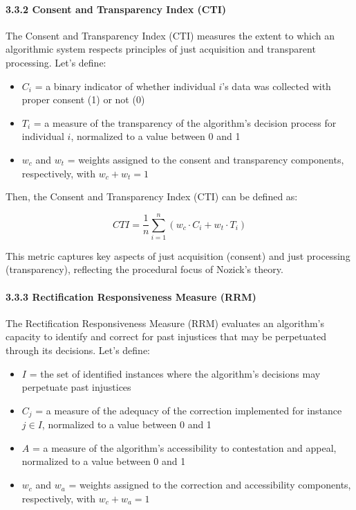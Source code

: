 \paragraph{3.3.2 Consent and Transparency Index
(CTI)}\label{consent-and-transparency-index-cti}

The Consent and Transparency Index (CTI) measures the extent to which an
algorithmic system respects principles of just acquisition and
transparent processing. Let's define:

\begin{itemize}
\tightlist
\item
  \(C_i\) = a binary indicator of whether individual \(i\)'s data was
  collected with proper consent (1) or not (0)
\item
  \(T_i\) = a measure of the transparency of the algorithm's decision
  process for individual \(i\), normalized to a value between 0 and 1
\item
  \(w_c\) and \(w_t\) = weights assigned to the consent and transparency
  components, respectively, with \(w_c + w_t = 1\)
\end{itemize}

Then, the Consent and Transparency Index (CTI) can be defined as:

\[CTI = \frac{1}{n} \sum_{i=1}^{n} (w_c \cdot C_i + w_t \cdot T_i)\]

This metric captures key aspects of just acquisition (consent) and just
processing (transparency), reflecting the procedural focus of Nozick's
theory.

\paragraph{3.3.3 Rectification Responsiveness Measure
(RRM)}\label{rectification-responsiveness-measure-rrm}

The Rectification Responsiveness Measure (RRM) evaluates an algorithm's
capacity to identify and correct for past injustices that may be
perpetuated through its decisions. Let's define:

\begin{itemize}
\tightlist
\item
  \(I\) = the set of identified instances where the algorithm's
  decisions may perpetuate past injustices
\item
  \(C_j\) = a measure of the adequacy of the correction implemented for
  instance \(j \in I\), normalized to a value between 0 and 1
\item
  \(A\) = a measure of the algorithm's accessibility to contestation and
  appeal, normalized to a value between 0 and 1
\item
  \(w_c\) and \(w_a\) = weights assigned to the correction and
  accessibility components, respectively, with \(w_c + w_a = 1\)
\end{itemize}

